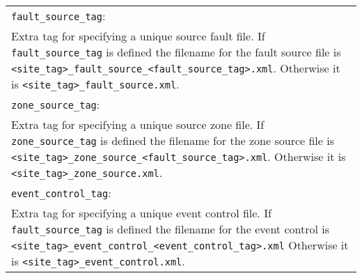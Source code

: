 \begin{table}
\vspace{2em}
\begin{tabular}{|p{\textwidth}|}
\hline \vspace{0.1em} \texttt{fault\_source\_tag}: \\
Extra tag for specifying a unique source fault file. 
If  \texttt{fault\_source\_tag} is defined the
filename for the fault source file is
\texttt{<site\_tag>\_fault\_source\_<fault\_source\_tag>.xml}.
Otherwise it is \texttt{<site\_tag>\_fault\_source.xml}.
\\
\hline \vspace{0.1em} \texttt{zone\_source\_tag}: \\
Extra tag for specifying a unique source zone file. 
If  \texttt{zone\_source\_tag} is defined the
filename for the zone source file is
\texttt{<site\_tag>\_zone\_source\_<fault\_source\_tag>.xml}.
Otherwise it is \texttt{<site\_tag>\_zone\_source.xml}.
\\
\hline \vspace{0.1em} \texttt{event\_control\_tag}: \\
Extra tag for specifying a unique event control file.
If  \texttt{fault\_source\_tag} is defined the
filename for the event control is
\texttt{<site\_tag>\_}\texttt{event\_control\_}\texttt{<event\_control\_tag>}\texttt{.xml}
Otherwise it is \texttt{<site\_tag>\_event\_control.xml}.
\\
\hline
 \end{tabular}
\end{table}

